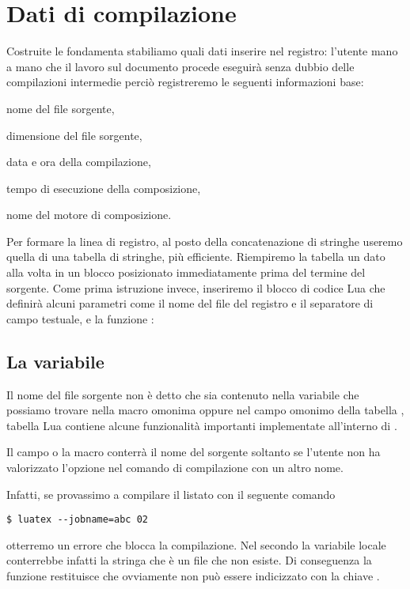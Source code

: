 \section{Dati di compilazione}

Costruite le fondamenta stabiliamo quali dati inserire nel registro: l'utente 
mano a mano che il lavoro sul documento procede eseguirà senza dubbio delle
compilazioni intermedie perciò registreremo le seguenti informazioni base:
\begin{compactenumerate}
\item nome del file sorgente,
\item dimensione del file sorgente,
\item data e ora della compilazione,
\item tempo di esecuzione della composizione,
\item nome del motore di composizione.
\end{compactenumerate}

Per formare la linea di registro, al posto della concatenazione di stringhe
useremo quella di una tabella di stringhe, più efficiente. Riempiremo la tabella
un dato alla volta in un blocco  posizionato immediatamente prima
del termine del sorgente. Come prima istruzione invece, inseriremo il blocco di
codice Lua che definirà alcuni parametri come il nome del file del registro e il
separatore di campo testuale, e la funzione :


\subsection{La variabile }

Il nome del file sorgente non è detto che sia contenuto nella variabile
 che possiamo trovare nella macro omonima oppure nel campo omonimo
della tabella , tabella Lua contiene alcune funzionalità importanti
implementate all'interno di \LuaTeX.

Il campo o la macro conterrà il nome del sorgente soltanto se l'utente non ha
valorizzato l'opzione  nel comando di compilazione con un altro
nome.

Infatti, se provassimo a compilare il listato  con il seguente
comando
\begin{Verbatim}
$ luatex --jobname=abc 02
\end{Verbatim}
otterremo un errore che blocca la compilazione. Nel secondo  la
variabile locale  conterrebbe infatti la stringa 
che è un file che non esiste. Di conseguenza la funzione 
restituisce  che ovviamente non può essere indicizzato con la chiave
.

